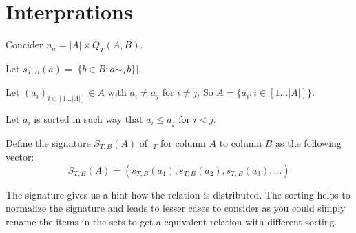\section{Interprations}
Concider $n_a = |A| \times Q_T(A,B)$. 

\begin{definition}[Signature $S_{T,B}(A)$]
  Let $s_{T,B}(a) = |\{ b \in B : a \sim_T b \}|$.

  Let $(a_i)_{i \in [1 \ldots |A|]} \in A$ with $a_i \neq a_j$ for $i \neq j$.
  So $A = \{ a_i : i \in [1 \ldots |A|] \}$.

  Let $a_i$ is sorted in such way that $a_i \leq a_j$ for $i < j$.

  Define the signature $S_{T,B}(A)$ of $~_T$ for column $A$ to column $B$ as the following vector:
  \begin{equation}
    S_{T,B}(A) = (s_{T,B}(a_1), s_{T,B}(a_2), s_{T,B}(a_3), \ldots )
  \end{equation}
\end{definition}

The signature gives us a hint how the relation is distributed.
The sorting helps to normalize the signature and leads to lesser cases to consider as you could simply rename the items in the sets to get a equivalent relation with different sorting.

